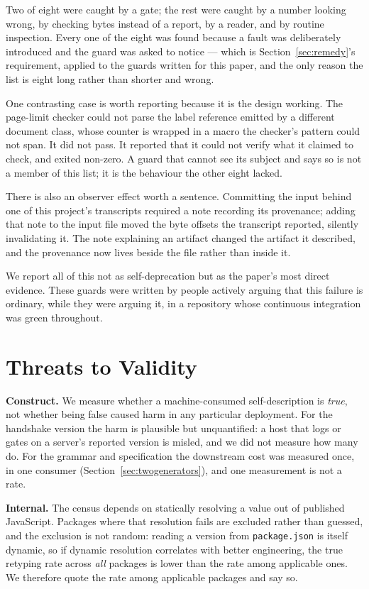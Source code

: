\documentclass[10pt,journal,compsoc]{IEEEtran}
\begin{document}
Two of eight were caught by a gate; the rest were caught by a number looking wrong, by
checking bytes instead of a report, by a reader, and by routine inspection. Every one of
the eight was found because a fault was deliberately introduced and the guard was asked to
notice --- which is Section~\ref{sec:remedy}'s requirement, applied to the guards written
for this paper, and the only reason the list is eight long rather than shorter and wrong.

One contrasting case is worth reporting because it is the design working. The page-limit
checker could not parse the label reference emitted by a different document class, whose
counter is wrapped in a macro the checker's pattern could not span. It did not pass. It
reported that it could not verify what it claimed to check, and exited non-zero. A guard
that cannot see its subject and says so is not a member of this list; it is the behaviour
the other eight lacked.

There is also an observer effect worth a sentence. Committing the input behind one of this
project's transcripts required a note recording its provenance; adding that note to the
input file moved the byte offsets the transcript reported, silently invalidating it. The
note explaining an artifact changed the artifact it described, and the provenance now lives
beside the file rather than inside it.

We report all of this not as self-deprecation but as the paper's most direct evidence.
These guards were written by people actively arguing that this failure is ordinary, while
they were arguing it, in a repository whose continuous integration was green throughout.

\section{Threats to Validity}\label{sec:threats}

\textbf{Construct.} We measure whether a machine-consumed self-description is
\emph{true}, not whether being false caused harm in any particular deployment. For the
handshake version the harm is plausible but unquantified: a host that logs or gates on a
server's reported version is misled, and we did not measure how many do. For the grammar
and specification the downstream cost was measured once, in one consumer
(Section~\ref{sec:twogenerators}), and one measurement is not a rate.

\textbf{Internal.} The census depends on statically resolving a value out of published
JavaScript. Packages where that resolution fails are excluded rather than guessed, and
the exclusion is not random: reading a version from \texttt{package.json} is itself
dynamic, so if dynamic resolution correlates with better engineering, the true retyping
rate across \emph{all} packages is lower than the rate among applicable ones. We
therefore quote the rate among applicable packages and say so.
\end{document}
